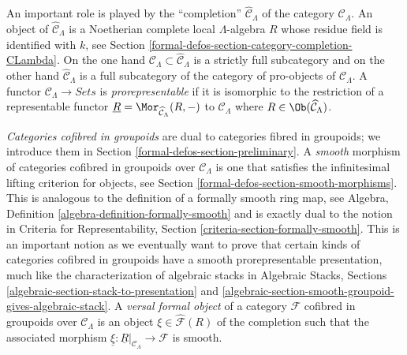 \medskip\noindent
An important role is played by the ``completion''
$\widehat{\mathcal{C}}_\Lambda$ of the category $\mathcal{C}_\Lambda$.
An object of $\widehat{\mathcal{C}}_\Lambda$ is a Noetherian complete
local $\Lambda$-algebra $R$ whose residue field is identified with $k$, see
Section \ref{formal-defos-section-category-completion-CLambda}.
On the one hand $\mathcal{C}_\Lambda \subset \widehat{\mathcal{C}}_\Lambda$
is a strictly full subcategory and on the other hand
$\widehat{\mathcal{C}}_\Lambda$ is a full subcategory of the category
of pro-objects of $\mathcal{C}_\Lambda$. A functor
$\mathcal{C}_\Lambda \to \textit{Sets}$ is {\it prorepresentable}
if it is isomorphic to the restriction of a representable functor
$\underline{R} = \Mor_{\widehat{\mathcal{C}}_\Lambda}(R, -)$
to $\mathcal{C}_\Lambda$ where
$R \in \Ob(\widehat{\mathcal{C}}_\Lambda)$.

\medskip\noindent
{\it Categories cofibred in groupoids} are dual to categories fibred in
groupoids; we introduce them in Section \ref{formal-defos-section-preliminary}.
A {\it smooth} morphism of categories cofibred in groupoids over
$\mathcal{C}_\Lambda$ is one that satisfies the infinitesimal lifting
criterion for objects, see
Section \ref{formal-defos-section-smooth-morphisms}.
This is analogous to the definition of a formally smooth ring map, see
Algebra, Definition \ref{algebra-definition-formally-smooth}
and is exactly dual to the notion in
Criteria for Representability, Section \ref{criteria-section-formally-smooth}.
This is an important notion as we eventually want to prove that certain
kinds of categories cofibred in groupoids have a smooth prorepresentable
presentation, much like the characterization of algebraic stacks in
Algebraic Stacks, Sections \ref{algebraic-section-stack-to-presentation} and
\ref{algebraic-section-smooth-groupoid-gives-algebraic-stack}.
A {\it versal formal object} of a category $\mathcal{F}$ cofibred
in groupoids over $\mathcal{C}_\Lambda$ is an object
$\xi \in \widehat{\mathcal{F}}(R)$ of the completion such that the
associated morphism
$\underline{\xi} : \underline{R}|_{\mathcal{C}_\Lambda} \to \mathcal{F}$
is smooth.

